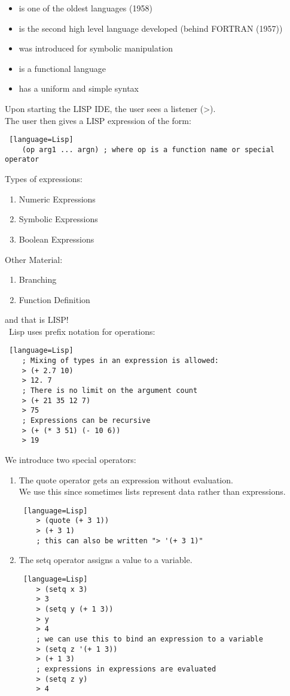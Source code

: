 \documentclass[../../lecture_notes.tex]{subfiles}
\begin{document}
\begin{itemize} [itemsep=0mm]
	\item is one of the oldest languages (1958)
	\item is the second high level language developed (behind FORTRAN (1957))
	\item was introduced for symbolic manipulation
	\item is a functional language
	\item has a uniform and simple syntax
\end{itemize} \medskip

\noindent Upon starting the LISP IDE, the user sees a listener (>).\\
The user then gives a LISP expression of the form:
\begin{lstlisting} [language=Lisp]
    (op arg1 ... argn) ; where op is a function name or special operator
\end{lstlisting} \medskip

\noindent Types of expressions:
\begin{enumerate}
\item Numeric Expressions
\item Symbolic Expressions
\item Boolean Expressions
\end{enumerate}

\noindent Other Material:
\begin{enumerate}
\item Branching 
\item Function Definition
\end{enumerate}
\noindent and that is LISP!\\
\
Lisp uses prefix notation for operations:
\begin{lstlisting} [language=Lisp]
	; Mixing of types in an expression is allowed:
	> (+ 2.7 10)
	> 12. 7
	; There is no limit on the argument count
	> (+ 21 35 12 7)
	> 75
	; Expressions can be recursive
	> (+ (* 3 51) (- 10 6))
	> 19
\end{lstlisting} \medskip

\noindent We introduce two special operators:
\begin{enumerate} 
\item The quote operator gets an expression without evaluation.\\
	We use this since sometimes lists represent data rather than expressions.
\begin{lstlisting} [language=Lisp]
	> (quote (+ 3 1))
	> (+ 3 1)
	; this can also be written "> '(+ 3 1)"
\end{lstlisting}
\item The setq operator assigns a value to a variable.
\begin{lstlisting} [language=Lisp]
	> (setq x 3)
	> 3
	> (setq y (+ 1 3))
	> y
	> 4
	; we can use this to bind an expression to a variable
	> (setq z '(+ 1 3))
	> (+ 1 3)
	; expressions in expressions are evaluated
	> (setq z y)
	> 4
\end{lstlisting}
\end{enumerate} \medskip
\end{document}
